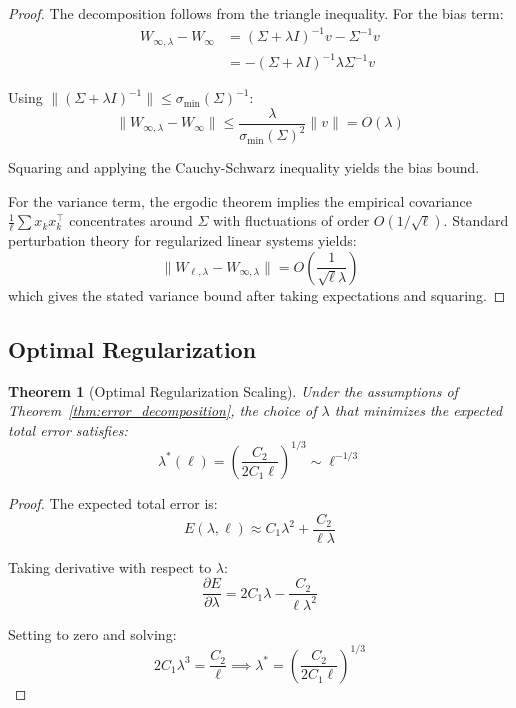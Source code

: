 \documentclass[11pt]{article}
\newtheorem{theorem}{Theorem}
\theoremstyle{definition}
\theoremstyle{remark}
\begin{document}
\begin{proof}
The decomposition follows from the triangle inequality. For the bias term:
\begin{align}
W_{\infty,\lambda} - W_\infty &= (\Sigma + \lambda I)^{-1}v - \Sigma^{-1}v \\
&= -(\Sigma + \lambda I)^{-1} \lambda \Sigma^{-1} v
\end{align}

Using $\|(\Sigma + \lambda I)^{-1}\| \leq \sigma_{\min}(\Sigma)^{-1}$:
$$\|W_{\infty,\lambda} - W_\infty\| \leq \frac{\lambda}{\sigma_{\min}(\Sigma)^2} \|v\| = O(\lambda)$$

Squaring and applying the Cauchy-Schwarz inequality yields the bias bound.

For the variance term, the ergodic theorem implies the empirical covariance $\frac{1}{\ell}\sum x_k x_k^\top$ concentrates around $\Sigma$ with fluctuations of order $O(1/\sqrt{\ell})$. Standard perturbation theory for regularized linear systems yields:
$$\|W_{\ell,\lambda} - W_{\infty,\lambda}\| = O\left(\frac{1}{\sqrt{\ell} \lambda}\right)$$
which gives the stated variance bound after taking expectations and squaring.
\end{proof}

\subsection{Optimal Regularization}

\begin{theorem}[Optimal Regularization Scaling]
\label{thm:optimal_lambda}
Under the assumptions of Theorem~\ref{thm:error_decomposition}, the choice of $\lambda$ that minimizes the expected total error satisfies:
\begin{equation}
\lambda^*(\ell) = \left(\frac{C_2}{2C_1 \ell}\right)^{1/3} \sim \ell^{-1/3}
\end{equation}
\end{theorem}

\begin{proof}
The expected total error is:
$$E(\lambda, \ell) \approx C_1 \lambda^2 + \frac{C_2}{\ell \lambda}$$

Taking derivative with respect to $\lambda$:
$$\frac{\partial E}{\partial \lambda} = 2C_1 \lambda - \frac{C_2}{\ell \lambda^2}$$

Setting to zero and solving:
$$2C_1 \lambda^3 = \frac{C_2}{\ell} \implies \lambda^* = \left(\frac{C_2}{2C_1\ell}\right)^{1/3}$$
\end{proof}
\end{document}
